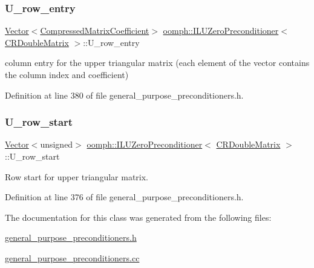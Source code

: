 \subsubsection{\texorpdfstring{U\+\_\+row\+\_\+entry}{U\_row\_entry}}
{\footnotesize\ttfamily \hyperlink{classoomph_1_1Vector}{Vector}$<$\hyperlink{classoomph_1_1CompressedMatrixCoefficient}{Compressed\+Matrix\+Coefficient}$>$ \hyperlink{classoomph_1_1ILUZeroPreconditioner}{oomph\+::\+I\+L\+U\+Zero\+Preconditioner}$<$ \hyperlink{classoomph_1_1CRDoubleMatrix}{C\+R\+Double\+Matrix} $>$\+::U\+\_\+row\+\_\+entry\hspace{0.3cm}{\ttfamily [private]}}



column entry for the upper triangular matrix (each element of the vector contains the column index and coefficient) 



Definition at line 380 of file general\+\_\+purpose\+\_\+preconditioners.\+h.

\mbox{\label{classoomph_1_1ILUZeroPreconditioner_3_01CRDoubleMatrix_01_4_a55c985417680ae5b26de020f6497cdfe}} 
\subsubsection{\texorpdfstring{U\+\_\+row\+\_\+start}{U\_row\_start}}
{\footnotesize\ttfamily \hyperlink{classoomph_1_1Vector}{Vector}$<$unsigned$>$ \hyperlink{classoomph_1_1ILUZeroPreconditioner}{oomph\+::\+I\+L\+U\+Zero\+Preconditioner}$<$ \hyperlink{classoomph_1_1CRDoubleMatrix}{C\+R\+Double\+Matrix} $>$\+::U\+\_\+row\+\_\+start\hspace{0.3cm}{\ttfamily [private]}}



Row start for upper triangular matrix. 



Definition at line 376 of file general\+\_\+purpose\+\_\+preconditioners.\+h.



The documentation for this class was generated from the following files\+:\begin{DoxyCompactItemize}
\item 
\hyperlink{general__purpose__preconditioners_8h}{general\+\_\+purpose\+\_\+preconditioners.\+h}\item 
\hyperlink{general__purpose__preconditioners_8cc}{general\+\_\+purpose\+\_\+preconditioners.\+cc}\end{DoxyCompactItemize}
